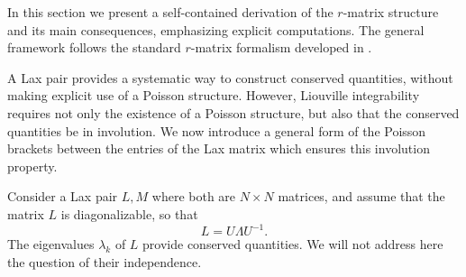 In this section we present a self-contained derivation of the $r$-matrix structure and its main consequences, emphasizing explicit computations. The general framework follows the standard $r$-matrix formalism developed in \cite{SemenovTyanShanskii1983,Sklyanin1982,babelon2003introduction}.

A Lax pair provides a systematic way to construct conserved quantities, without making explicit use of a Poisson structure. However, Liouville integrability requires not only the existence of a Poisson structure, but also that the conserved quantities be in involution.
We now introduce a general form of the Poisson brackets between the entries of the Lax matrix which ensures this involution property.

Consider a Lax pair $L, M$ where both are $N \times N$ matrices, and assume that the matrix $L$ is diagonalizable, so that
\begin{equation} \label{eq:lambda_matrix}
    L = U \Lambda U^{-1}.
\end{equation}
The eigenvalues $\lambda_k$ of $L$ provide conserved quantities. We will not address here the question of their independence.

